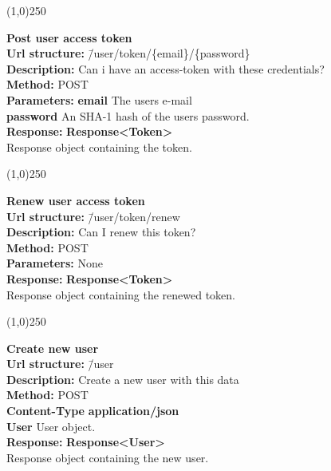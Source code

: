 \documentclass[11pt]{article}
\begin{document}
\begin{center}\line(1,0){250}\end{center}

\begin{tabbing}
\textbf{Post user access token} \\
\textcolor{black!60}{\textbf{Url structure:}} \hspace{0.2in} \= /user/token/\{email\}/\{password\} \\
\textcolor{black!60}{\textbf{Description:}}  \> Can i have an access-token with these credentials? \\
\textcolor{black!60}{\textbf{Method:}} \> POST \\
\textcolor{black!60}{\textbf{Parameters:}} \> \textbf{email} The users e-mail \\
\> \textbf{password} An SHA-1 hash of the users password. \\
\textcolor{black!60}{\textbf{Response:}} \> \textbf{Response<Token>} \\
\> Response object containing the token.
\end{tabbing}

\begin{center}\line(1,0){250}\end{center}

\begin{tabbing}
\textbf{Renew user access token} \\
\textcolor{black!60}{\textbf{Url structure:}} \hspace{0.2in} \= /user/token/renew \\
\textcolor{black!60}{\textbf{Description:}}  \> Can I renew this token? \\
\textcolor{black!60}{\textbf{Method:}} \> POST \\
\textcolor{black!60}{\textbf{Parameters:}} \> None \\
\textcolor{black!60}{\textbf{Response:}} \> \textbf{Response<Token>} \\
\> Response object containing the renewed token.
\end{tabbing}

\begin{center}\line(1,0){250}\end{center}

\begin{tabbing}
\textbf{Create new user} \\
\textcolor{black!60}{\textbf{Url structure:}} \hspace{0.2in} \= /user \\
\textcolor{black!60}{\textbf{Description:}}  \> Create a new user with this data \\
\textcolor{black!60}{\textbf{Method:}} \> POST \\
\textcolor{black!60}{\textbf{Content-Type}} \> \textbf{application/json} \\
\> \textbf{User} User object.\\
\textcolor{black!60}{\textbf{Response:}} \> \textbf{Response<User>} \\
\> Response object containing the new user.
\end{tabbing}
\end{document}
